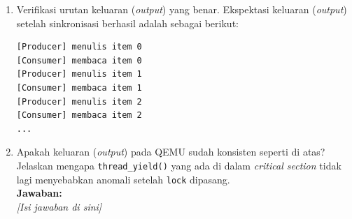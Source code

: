 \begin{enumerate}
	      \begin{figure}[H]
		      \centering
		      \begin{minipage}[t]{0.48\textwidth}
			      \centering
			      \caption*{(a) Sebelum sinkronisasi (\textit{race condition})}
		      \end{minipage}%
		      \hfill
		      \begin{minipage}[t]{0.48\textwidth}
			      \centering
			      \caption*{(b) Setelah sinkronisasi}
		      \end{minipage}
		      \caption{Perbandingan tampilan QEMU sebelum dan sesudah penerapan mekanisme sinkronisasi.}
		      \label{fig:h05-4-compare}
	      \end{figure}

	\item Verifikasi urutan keluaran (\textit{output}) yang benar. Ekspektasi keluaran (\textit{output}) setelah sinkronisasi berhasil adalah sebagai berikut:

	      \begin{lstlisting}[caption={Ekspektasi keluaran (\textit{output}) \textit{Producer-Consumer} yang tersinkronisasi}]
[Producer] menulis item 0
[Consumer] membaca item 0
[Producer] menulis item 1
[Consumer] membaca item 1
[Producer] menulis item 2
[Consumer] membaca item 2
...
    \end{lstlisting}

	\item Apakah keluaran (\textit{output}) pada QEMU sudah konsisten seperti di atas? Jelaskan mengapa \texttt{thread\_yield()} yang ada di dalam \textit{critical section} tidak lagi menyebabkan anomali setelah \texttt{lock} dipasang.\\[0.2cm]
	      \textbf{Jawaban:}\\
	      \textit{[Isi jawaban di sini]}


\end{enumerate}
